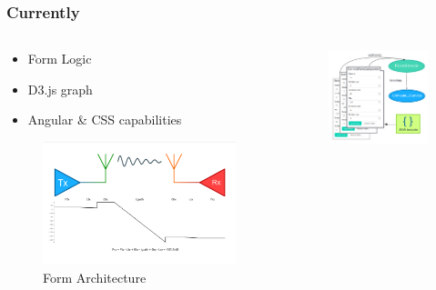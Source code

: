 \documentclass[11pt]{beamer}
\begin{document}
\begin{frame}
\frametitle{Currently}
	\begin{columns}[onlytextwidth]
		\begin{column}{0.5\textwidth}
			\begin{itemize}
				\item Form Logic
				\item D3.js graph
				\item Angular \& CSS capabilities
			\end{itemize}
			\begin{figure}[hbtp]
			\centering
				\includegraphics[width=\textwidth]{src/d3.png}
				\caption{Form Architecture}
			\end{figure}
		\end{column}
		\hfill
		\begin{column}{0.4\textwidth}
			\begin{figure}[hbtp]
				\centering
				\includegraphics[width=\textwidth]{src/formArchSimplified.png}

\end{figure}
\end{column}
\end{columns}
\end{frame}
\end{document}
